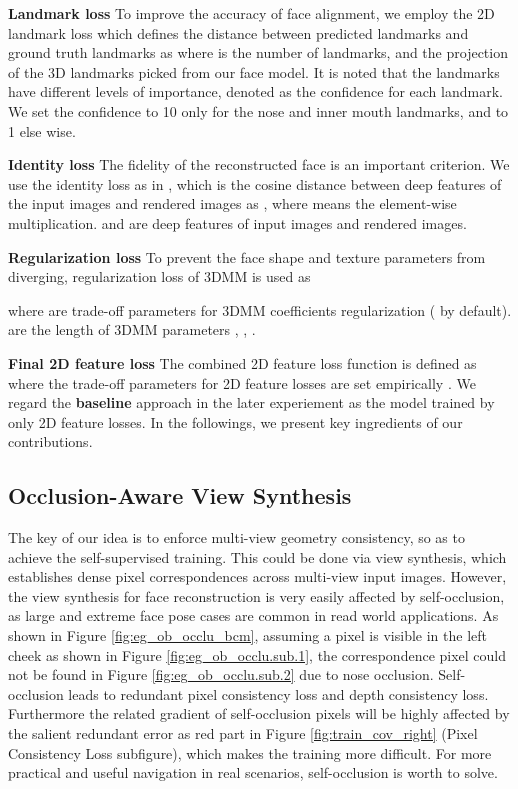 \documentclass[runningheads]{llncs}
\begin{document}
\noindent
\textbf{Landmark loss} 
To improve the accuracy of face alignment, we employ the 2D landmark loss which defines the distance between predicted landmarks and ground truth landmarks as 
where  is the number of landmarks, and  the projection of the 3D landmarks picked from our face model.
It is noted that the landmarks have different levels of importance, denoted as the confidence  for each landmark. We set the confidence to 10 only for the nose and inner mouth landmarks, and to 1 else wise.

\noindent
\textbf{Identity loss} 
The fidelity of the reconstructed face is an important criterion.
We use the identity loss as in \cite{unsuper_genova2018unsupervised}, which is the cosine distance between deep features of the input images and rendered images as , where  means the element-wise multiplication.  and  are deep features of input images and rendered images. 


\noindent
\textbf{Regularization loss} 
To prevent the face shape and texture parameters from diverging, regularization loss of 3DMM is used as 
\begin{comment}

\end{comment}
where  are trade-off parameters for 3DMM coefficients regularization ( by default).
 are the length of 3DMM parameters , , .


\noindent
\textbf{Final 2D feature loss} 
The combined 2D feature loss function  is defined as 
where the trade-off parameters for 2D feature losses are set empirically .
We regard the \textbf{baseline} approach in the later experiement as the model trained by only 2D feature losses. In the followings, we present key ingredients of our contributions.

\subsection{Occlusion-Aware View Synthesis} \label{sec:oavs}
The key of our idea is to enforce multi-view geometry consistency, so as to achieve the self-supervised training.
This could be done via view synthesis, which establishes dense pixel correspondences across multi-view input images. However, the view synthesis for face reconstruction is very easily affected by self-occlusion, as large and extreme face pose cases are common in read world applications.
As shown in Figure \ref{fig:eg_ob_occlu_bcm}, assuming a pixel  is visible in the left cheek as shown in Figure \ref{fig:eg_ob_occlu.sub.1}, the correspondence pixel   could not be found in Figure \ref{fig:eg_ob_occlu.sub.2} due to nose occlusion.
Self-occlusion leads to redundant pixel consistency loss and depth consistency loss. Furthermore the related gradient of self-occlusion pixels will be highly affected by the salient redundant error as red part in Figure \ref{fig:train_cov_right} (Pixel Consistency Loss subfigure), which makes the training more difficult.
For more practical and useful navigation in real scenarios, self-occlusion is worth to solve.
\end{document}
